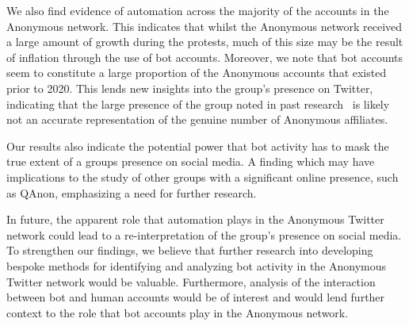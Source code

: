 \documentclass[letterpaper]{article}
\begin{document}
We also find evidence of automation across the majority of the accounts in the Anonymous network. This indicates that whilst the Anonymous network received a large amount of growth during the protests, much of this size may be the result of inflation through the use of bot accounts. Moreover, we note that bot accounts seem to constitute a large proportion of the Anonymous accounts that existed prior to 2020. This lends new insights into the group's presence on Twitter, indicating that the large presence of the group noted in past research~\cite{Jones2020} is likely not an accurate representation of the genuine number of Anonymous affiliates. 

Our results also indicate the potential power that bot activity has to mask the true extent of a groups presence on social media. A finding which may have implications to the study of other groups with a significant online presence, such as QAnon, emphasizing a need for further research.

In future, the apparent role that automation plays in the Anonymous Twitter network could lead to a re-interpretation of the group's presence on social media. To strengthen our findings, we believe that further research into developing bespoke methods for identifying and analyzing bot activity in the Anonymous Twitter network would be valuable. Furthermore, analysis of the interaction between bot and human accounts would be of interest and would lend further context to the role that bot accounts play in the Anonymous network.


\fontsize{9.0pt}{10.0pt} 
\selectfont
%
 
\end{document}
